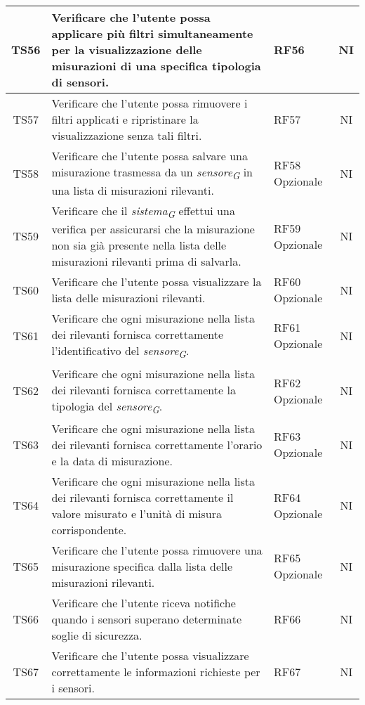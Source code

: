 \begin{longtable}{|c|p{5cm}|>{\raggedright}p{2cm}|c|}
        \hline
        TS56 & Verificare che l'utente possa applicare più filtri simultaneamente per la visualizzazione delle misurazioni di una specifica tipologia di sensori. & RF56 & NI \\
        \hline
        TS57 & Verificare che l'utente possa rimuovere i filtri applicati e ripristinare la visualizzazione senza tali filtri. & RF57 & NI \\
        \hline
        TS58 & Verificare che l'utente possa salvare una misurazione trasmessa da un \textit{sensore}\textsubscript{\textit{G}} in una lista di misurazioni rilevanti. & RF58 Opzionale & NI \\
        \hline
        TS59 & Verificare che il \textit{sistema}\textsubscript{\textit{G}} effettui una verifica per assicurarsi che la misurazione non sia già presente nella lista delle misurazioni rilevanti prima di salvarla. & RF59 Opzionale & NI \\
        \hline
        TS60 & Verificare che l'utente possa visualizzare la lista delle misurazioni rilevanti. & RF60 Opzionale & NI \\
        \hline
        TS61 & Verificare che ogni misurazione nella lista dei rilevanti fornisca correttamente l'identificativo del \textit{sensore}\textsubscript{\textit{G}}. & RF61 Opzionale & NI \\
        \hline
        TS62 & Verificare che ogni misurazione nella lista dei rilevanti fornisca correttamente la tipologia del \textit{sensore}\textsubscript{\textit{G}}. & RF62 Opzionale & NI \\
        \hline
        TS63 & Verificare che ogni misurazione nella lista dei rilevanti fornisca correttamente l'orario e la data di misurazione. & RF63 Opzionale & NI \\
        \hline
        TS64 & Verificare che ogni misurazione nella lista dei rilevanti fornisca correttamente il valore misurato e l'unità di misura corrispondente. & RF64 Opzionale & NI \\
        \hline
        TS65 & Verificare che l'utente possa rimuovere una misurazione specifica dalla lista delle misurazioni rilevanti. & RF65 Opzionale & NI \\
        \hline
        TS66 & Verificare che l'utente riceva notifiche quando i sensori superano determinate soglie di sicurezza. & RF66 & NI \\
        \hline
        TS67 & Verificare che l'utente possa visualizzare correttamente le informazioni richieste per i sensori. & RF67 & NI \\

\end{longtable}
